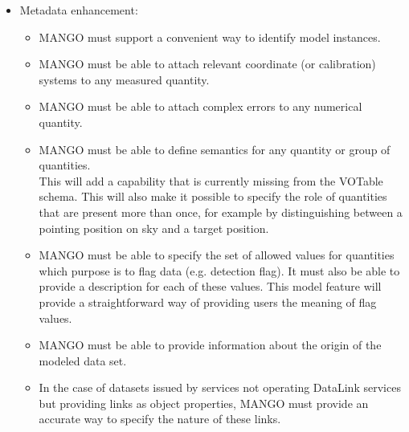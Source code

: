 \documentclass[11pt,a4paper]{ivoa}
\begin{document}
\begin{itemize}
    \item Metadata enhancement:
        \begin{itemize}[noitemsep,topsep=0pt,parsep=0pt,partopsep=0pt]
          \item MANGO must support a convenient way to identify model instances.
          \item MANGO must be able to attach relevant coordinate (or calibration) 
                systems to any measured quantity. 
          \item MANGO must be able to attach complex errors to any numerical quantity. 
          \item MANGO must be able to define semantics for any quantity or group of quantities. \\
                This will add a capability that is currently missing from the VOTable schema. 
                This will also make it possible to specify the role of quantities 
                that are present more than once, for example by distinguishing between a pointing position on sky 
                and a target position. 
          \item MANGO must be able to specify the set of allowed values for quantities which purpose is to flag data 
                (e.g. detection flag). It must also be able to provide a description for each of these values. 
                This model feature will provide a straightforward way of providing users the meaning of flag values. 
          \item MANGO must be able to provide information about the origin of the modeled data set.         
          \item In the case of datasets issued by services not operating DataLink services  \citep{2023ivoa.spec.1215B} but providing 
                links as object properties, MANGO must provide an accurate way to specify the nature of these links. 
        \end{itemize}  
         

\end{itemize}
\end{document}
